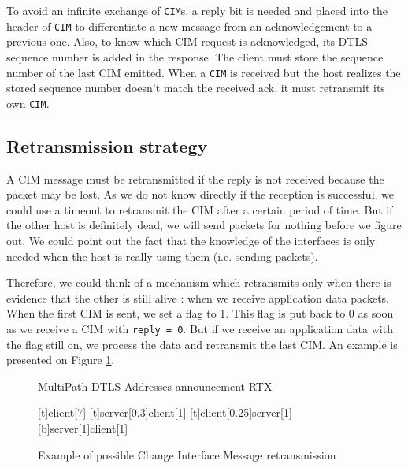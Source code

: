 To avoid an infinite exchange of \texttt{CIM}s, a reply bit is needed and placed into the header of \texttt{CIM} to differentiate a new message from an acknowledgement to a previous one. Also, to know which CIM request is acknowledged, its DTLS sequence number is added in the response. The client must store the sequence number of the last CIM emitted. When a \texttt{CIM} is received but the host realizes the stored sequence number doesn't match the received ack, it must retransmit its own \texttt{CIM}.

\subsection{Retransmission strategy}

A CIM message must be retransmitted if the reply is not received because the packet may be lost. As we do not know directly if the reception is successful, we could use a timeout to retransmit the CIM after a certain period of time. But if the other host is definitely dead, we will send packets for nothing before we figure out. We could point out the fact that the knowledge of the interfaces is only needed when the host is really using them (i.e. sending packets).

Therefore, we could think of a mechanism which retransmits only when there is evidence that the other is still alive : when we receive application data packets. When the first CIM is sent, we set a flag to 1. This flag is put back to 0 as soon as we receive a CIM with \verb$reply = 0$. But if we receive an application data with the flag still on, we process the data and retransmit the last CIM. An example is presented on Figure \ref{fig:CIMexchange2}.

\begin{figure}[!ht]
\centering
\begin{msc}[r]{MultiPath-DTLS Addresses announcement RTX}

\setlength{\instfootheight}{0em}
\setlength{\instheadheight}{0em}
\setlength{\instdist}{0.7\linewidth}
\setlength{\levelheight}{3em}


[t]{}{client}[7]
\nextlevel
{}[t]{server}[0.3]{client}[1]
\nextlevel
{}[t]{client}[0.25]{server}[1]
\nextlevel
{}[b]{server}[1]{client}[1]
\nextlevel
\nextlevel

\end{msc}
\caption{Example of possible Change Interface Message retransmission}
\label{fig:CIMexchange2}
\end{figure}

